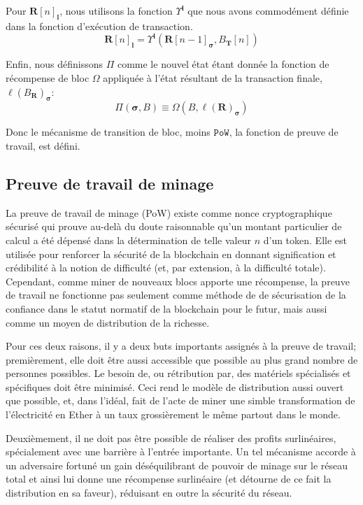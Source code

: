 \documentclass[9pt,oneside]{amsart}
\begin{document}
\begin{multicols}{2}
Pour $\mathbf{R}[n]_\mathbf{l}$, nous utilisons la fonction $\Upsilon^\mathbf{l}$ que nous avons commodément définie dans la fonction d'exécution de transaction.
\begin{equation}
\mathbf{R}[n]_\mathbf{l} =
\Upsilon^\mathbf{l}(\mathbf{R}[n - 1]_{\boldsymbol{\sigma}}, B_\mathbf{T}[n])
\end{equation}

Enfin, nous définissons $\Pi$ comme le nouvel état étant donnée la fonction de récompense de bloc $\Omega$ appliquée à l'état résultant de la transaction finale, $\ell(B_\mathbf{R})_{\boldsymbol{\sigma}}$:
\begin{equation}
\Pi(\boldsymbol{\sigma}, B) \equiv \Omega(B, \ell(\mathbf{R})_{\boldsymbol{\sigma}})
\end{equation}

Donc le mécanisme de transition de bloc, moins  $\mathtt{PoW}$, la fonction de preuve de travail, est défini.

\subsection{Preuve de travail de minage} \label{ch:pow}


La preuve de travail de minage (PoW) existe comme nonce cryptographique sécurisé qui prouve au-delà du doute raisonnable qu'un montant particulier de calcul a été dépensé dans la détermination de telle valeur $n$ d'un token. Elle est utilisée pour renforcer la sécurité de la blockchain en donnant signification et crédibilité à la notion de difficulté (et, par extension, à la difficulté totale). Cependant, comme miner de nouveaux blocs apporte une récompense, la preuve de travail ne fonctionne pas seulement comme méthode de de sécurisation de la confiance dans le statut normatif de la blockchain pour le futur, mais aussi comme un moyen de distribution de la richesse.

Pour ces deux raisons, il y a deux buts importants assignés à la preuve de travail; premièrement, elle doit être aussi accessible que possible au plus grand nombre de personnes possibles. Le besoin de, ou rétribution par, des matériels spécialisés et spécifiques doit être minimisé. Ceci rend le modèle de distribution aussi ouvert que possible, et, dans l'idéal, fait de l'acte de miner une simble transformation de l'électricité en Ether à un taux grossièrement le même partout dans le monde.

Deuxièmement, il ne doit pas être possible de réaliser des profits surlinéaires, spécialement avec une barrière à l'entrée importante. Un tel mécanisme accorde à un adversaire fortuné un gain déséquilibrant de pouvoir de minage sur le réseau total et ainsi lui donne une récompense surlinéaire (et détourne de ce fait la distribution en sa faveur), réduisant en outre la sécurité du réseau.


\end{multicols}
\end{document}
